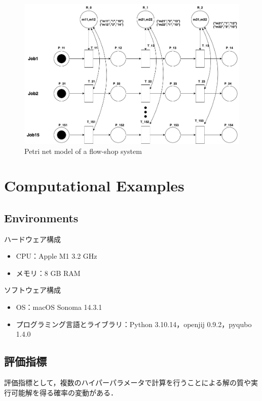 \documentclass[conference]{IEEEtran}
\begin{document}
\begin{figure}[htbp]
\centerline{\includegraphics[scale=0.25]{./fig/fsp.pdf}}
\caption{Petri net model of a flow-shop system}
\label{fig1}
\end{figure}



\section{Computational Examples}
\subsection{Environments}
ハードウェア構成
\begin{itemize}
\item CPU：Apple M1 3.2 GHz
\item メモリ：8 GB RAM
\end{itemize}

\vspace{\baselineskip}

ソフトウェア構成 
\begin{itemize}
\item OS：macOS Sonoma 14.3.1
\item プログラミング言語とライブラリ：Python 3.10.14，openjij 0.9.2，pyqubo 1.4.0
\end{itemize}



\subsection{評価指標}
評価指標として，複数のハイパーパラメータで計算を行うことによる解の質や実行可能解を得る確率の変動がある．
\end{document}
